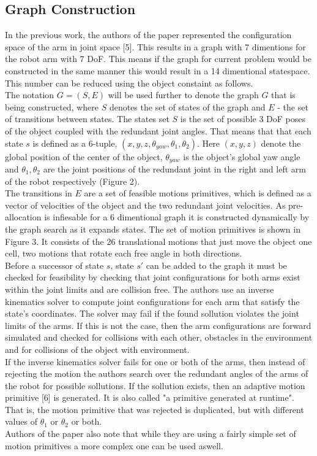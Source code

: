 \documentclass[11pt]{article}
\begin{document}
\subsection{Graph Construction}
In the previous work, the authors of the paper  represented the configuration space of the arm in joint space [5]. This results in a graph with 7 dimentions for the robot arm with 7 DoF. This means if the graph for current problem would be constructed in the same manner this would result in a 14 dimentional statespace. This number can be reduced using the object constaint as follows.\\
The notation $G=(S,E)$ will be used further to denote the graph $G$ that is being constructed, where $S$ denotes the set of states of the graph and $E$ - the set of transitions between states. The states set $S$ is the set of possible 3 DoF poses of the object coupled with the redundant joint angles. That means that that each state $s$ is defined as a 6-tuple, $(x,y,z,\theta_{yaw}, \theta_1, \theta_2)$. Here $(x,y,z)$ denote the global position of the center of the object, $\theta_{yaw}$ is the object's global yaw angle and $\theta_1, \theta_2$ are the joint positions of the redundant joint in the right and left arm of the robot respectively (Figure 2).\\
The transitions in $E$ are a set of feasible motions primitives, which is defined as a vector of velocities of the object and the two redundant joint velocities. As pre-allocation is infiesable for a 6 dimentional graph it is constructed dynamically by the graph search as it expands states. The set of motion primitives is shown in Figure 3. It consists of the 26 translational motions that just move the object one cell, two motions that rotate each free angle in both directions.\\
Before a successor of state $s$, state $s'$ can be added to the graph it must be checked for feasibility by checking that joint configurations for both arms exist within the joint limits and are collision free. The authors use an inverse kinematics solver to compute joint configurations for each arm that satisfy the state's coordinates. The solver may fail if the found sollution violates the joint limits of the arms. If this is not the case, then the arm configurations are forward simulated and checked for collisions with each other, obstacles in the environment and for collisions of the object with environment.\\
If the inverse kinematics solver fails for one or both of the arms, then instead of rejecting the motion the authors search over the redundant angles of the arms of the robot for possible sollutions. If the sollution exists, then an adaptive motion primitive [6] is generated. It is also called "a primitive generated at runtime". That is, the motion primitive that was rejected is duplicated, but with different values of $ \theta_1 $ or $ \theta_2 $ or both.\\
Authors of the paper also note that while they are using a fairly simple set of motion primitives a more complex one can be used aswell. 
\end{document}

